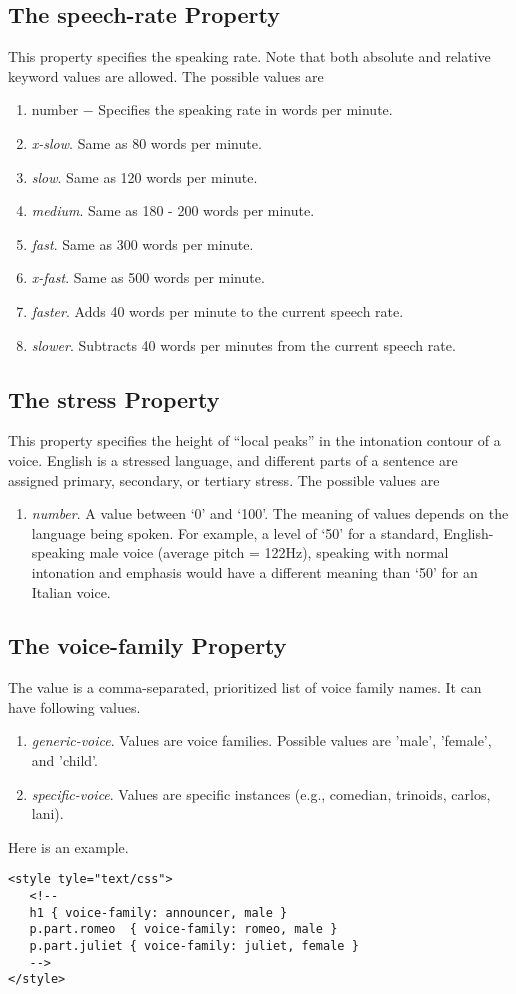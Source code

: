\documentclass[a4paper,oneside]{book}
\numberwithin{equation}{chapter}
\begin{document}
\subsection{The speech-rate Property}
This property specifies the speaking rate. Note that both absolute and relative keyword values are allowed. The possible values are
\begin{enumerate}
\item number − Specifies the speaking rate in words per minute.
\item \textit{x-slow}. Same as 80 words per minute.
\item \textit{slow}. Same as 120 words per minute.
\item \textit{medium}. Same as 180 - 200 words per minute.
\item \textit{fast}. Same as 300 words per minute.
\item \textit{x-fast}. Same as 500 words per minute.
\item \textit{faster}. Adds 40 words per minute to the current speech rate.
\item \textit{slower}. Subtracts 40 words per minutes from the current speech rate.
\end{enumerate}
\subsection{The stress Property}
This property specifies the height of ``local peaks'' in the intonation contour of a voice. English is a stressed language, and different parts of a sentence are assigned primary, secondary, or tertiary stress. The possible values are
\begin{enumerate}
\item \textit{number}. A value between `0' and `100'. The meaning of values depends on the language being spoken. For example, a level of `50' for a standard, English-speaking male voice (average pitch = 122Hz), speaking with normal intonation and emphasis would have a different meaning than `50' for an Italian voice.
\end{enumerate}
\subsection{The voice-family Property}
The value is a comma-separated, prioritized list of voice family names. It can have following values.
\begin{enumerate}
\item \textit{generic-voice}. Values are voice families. Possible values are 'male', 'female', and 'child'.
\item \textit{specific-voice}. Values are specific instances (e.g., comedian, trinoids, carlos, lani).
\end{enumerate}
Here is an example.
\begin{verbatim}
<style tyle="text/css">
   <!--
   h1 { voice-family: announcer, male }
   p.part.romeo  { voice-family: romeo, male }
   p.part.juliet { voice-family: juliet, female }
   -->
</style>
\end{verbatim}
\end{document}
